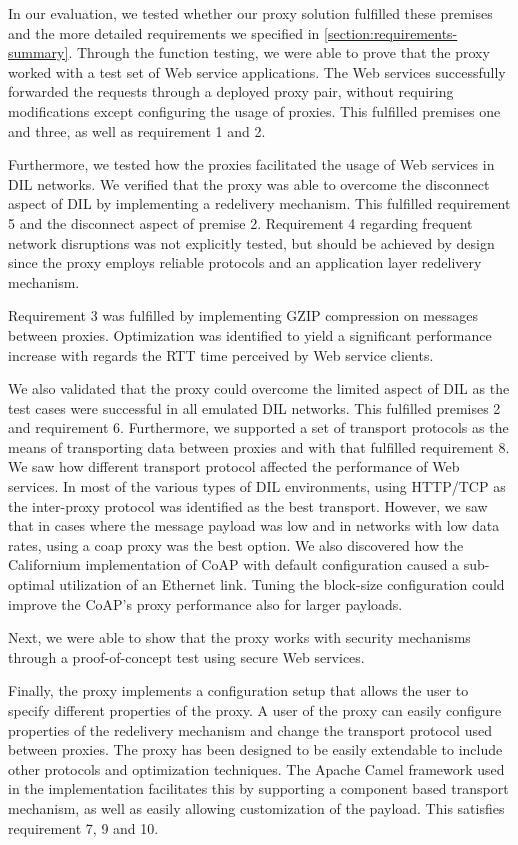 In our evaluation, we tested whether our proxy solution fulfilled these premises
and the more detailed requirements we specified in
\cref{section:requirements-summary}. Through the function testing, we were able
to prove that the proxy worked with a test set of Web service applications. The
Web services successfully forwarded the requests through a deployed proxy pair,
without requiring modifications except configuring the usage of proxies. This
fulfilled premises one and three, as well as requirement 1 and 2.

Furthermore, we tested how the proxies facilitated the usage of Web services in
DIL networks. We verified that the proxy was able to overcome the disconnect
aspect of DIL by implementing a redelivery mechanism. This fulfilled requirement
5 and the disconnect aspect of premise 2. Requirement 4 regarding frequent
network disruptions was not explicitly tested, but should be achieved by design
since the proxy employs reliable protocols and an application layer redelivery
mechanism.

Requirement 3 was fulfilled by implementing GZIP compression on messages between
proxies. Optimization was identified to yield a significant performance increase with
regards the RTT time perceived by Web service clients.

We also validated that the proxy could overcome the limited aspect of DIL as the
test cases were successful in all emulated DIL networks. This fulfilled premises
2 and requirement 6. Furthermore, we supported a set of transport protocols as
the means of transporting data between proxies and with that fulfilled
requirement 8. We saw how different transport protocol affected the performance
of Web services. In most of the various types of DIL environments, using
HTTP/TCP as the inter-proxy protocol was identified as the best transport.
However, we saw that in cases where the message payload was low and in networks
with low data rates, using a \gls{coap} proxy was the best option. We also
discovered how the Californium implementation of CoAP with default configuration
caused a sub-optimal utilization of an Ethernet link. Tuning the block-size
configuration could improve the CoAP's proxy performance also for larger
payloads.

Next, we were able to show that the proxy works with security mechanisms through
a proof-of-concept test using secure Web services.

Finally, the proxy implements a configuration setup that allows the user to
specify different properties of the proxy. A user of the proxy can easily
configure properties of the redelivery mechanism and change the transport
protocol used between proxies. The proxy has been designed to be easily
extendable to include other protocols and optimization techniques. The Apache
Camel framework used in the implementation facilitates this by supporting a
component based transport mechanism, as well as easily allowing customization of
the payload. This satisfies requirement 7, 9 and 10.



